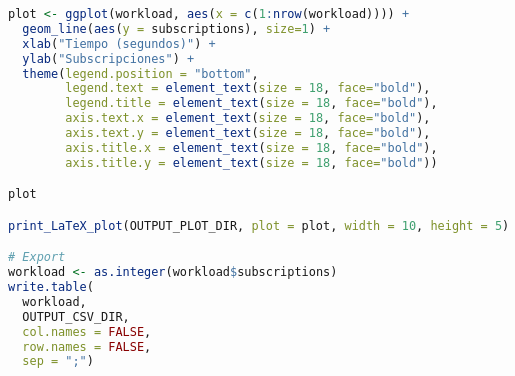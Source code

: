 \begin{lstlisting}[language=R, caption={Programa en R que genera una carga de subscripciones con un pico puntual, como en la \autoref{fig:subsworkload_20k-100k}}]
plot <- ggplot(workload, aes(x = c(1:nrow(workload)))) +
  geom_line(aes(y = subscriptions), size=1) +
  xlab("Tiempo (segundos)") +
  ylab("Subscripciones") +
  theme(legend.position = "bottom",
        legend.text = element_text(size = 18, face="bold"),
        legend.title = element_text(size = 18, face="bold"),
        axis.text.x = element_text(size = 18, face="bold"),
        axis.text.y = element_text(size = 18, face="bold"),
        axis.title.x = element_text(size = 18, face="bold"),
        axis.title.y = element_text(size = 18, face="bold"))

plot

print_LaTeX_plot(OUTPUT_PLOT_DIR, plot = plot, width = 10, height = 5)

# Export
workload <- as.integer(workload$subscriptions)
write.table(
  workload,
  OUTPUT_CSV_DIR,
  col.names = FALSE,
  row.names = FALSE,
  sep = ";")
\end{lstlisting}

